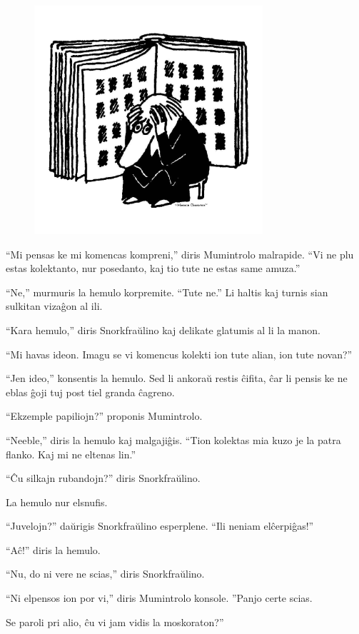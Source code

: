 \begin{figure}[htbp]
\centering
\includegraphics[width=240pt,height=240pt]{_6.jpg}
\caption{}
\label{_6}
\end{figure}

``Mi pensas ke mi komencas kompreni,'' diris Mumintrolo malrapide. ``Vi ne plu estas kolektanto, nur posedanto, kaj tio tute ne estas same amuza.''

``Ne,'' murmuris la hemulo korpremite. ``Tute ne.'' Li haltis kaj turnis sian sulkitan vizaĝon al ili.

``Kara hemulo,'' diris Snorkfraŭlino kaj delikate glatumis al li la manon.

``Mi havas ideon. Imagu se vi komencus kolekti ion tute alian, ion tute novan?''

``Jen ideo,'' konsentis la hemulo. Sed li ankoraŭ restis ĉifita, ĉar li pensis ke ne eblas ĝoji tuj post tiel granda ĉagreno.

``Ekzemple papiliojn?'' proponis Mumintrolo.

``Neeble,'' diris la hemulo kaj malgajiĝis. ``Tion kolektas mia kuzo je la patra flanko. Kaj mi ne eltenas lin.''

``Ĉu silkajn rubandojn?'' diris Snorkfraŭlino.

La hemulo nur elsnufis.

``Juvelojn?'' daŭrigis Snorkfraŭlino esperplene. ``Ili neniam elĉerpiĝas!''

``Aĉ!'' diris la hemulo.

``Nu, do ni vere ne scias,'' diris Snorkfraŭlino.

``Ni elpensos ion por vi,'' diris Mumintrolo konsole. ''Panjo certe scias.

Se paroli pri alio, ĉu vi jam vidis la moskoraton?''

